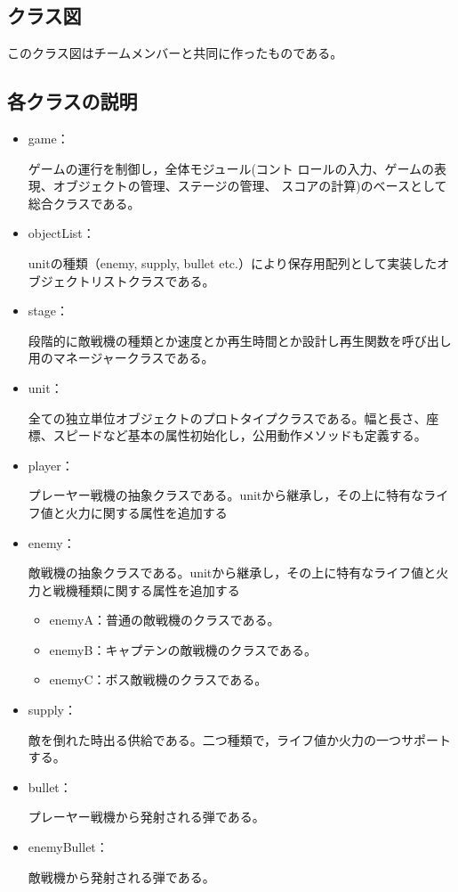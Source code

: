 \subsection{クラス図}
	このクラス図はチームメンバーと共同に作ったものである。
	
\subsection{各クラスの説明}
	\begin{itemize}
		\item game：
		
		ゲームの運行を制御し，全体モジュール(コント ロールの入力、ゲームの表現、オブジェクトの管理、ステージの管理、 スコアの計算)のベースとして総合クラスである。
		
		\item objectList：
		
		unitの種類（enemy, supply, bullet etc.）により保存用配列として実装したオブジェクトリストクラスである。
		
		\item stage：
		
		段階的に敵戦機の種類とか速度とか再生時間とか設計し再生関数を呼び出し用のマネージャークラスである。
		
		\item unit：
		
		全ての独立単位オブジェクトのプロトタイプクラスである。幅と長さ、座標、スピードなど基本の属性初始化し，公用動作メソッドも定義する。
		
		\item player：
		
		プレーヤー戦機の抽象クラスである。unitから継承し，その上に特有なライフ値と火力に関する属性を追加する
		
		\item enemy：
		
		敵戦機の抽象クラスである。unitから継承し，その上に特有なライフ値と火力と戦機種類に関する属性を追加する
			\begin{itemize}
				\item enemyA：普通の敵戦機のクラスである。
				\item enemyB：キャプテンの敵戦機のクラスである。
				\item enemyC：ボス敵戦機のクラスである。
			\end{itemize}
			
		\item supply：
		
		敵を倒れた時出る供給である。二つ種類で，ライフ値か火力の一つサポートする。
		
		\item bullet：
		
		プレーヤー戦機から発射される弾である。
		
		\item enemyBullet：
		
		敵戦機から発射される弾である。
		
	\end{itemize}